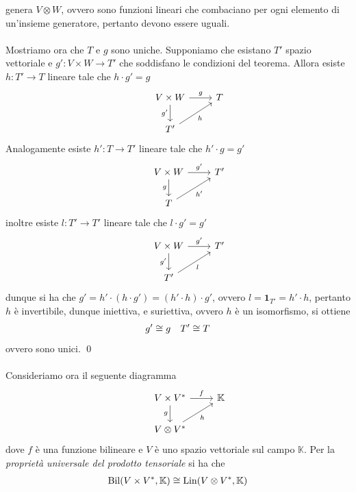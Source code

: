 \documentclass{article}
\begin{document}
genera $V \otimes W$, ovvero sono funzioni lineari che combaciano per ogni elemento di un'insieme generatore, pertanto devono essere uguali. \\ \\
Mostriamo ora che $T$ e $g$ sono uniche. Supponiamo che esistano $T'$ spazio vettoriale e $g' : V \times W \longrightarrow T'$ che soddisfano le condizioni del teorema. Allora esiste $h : T' \longrightarrow T$ lineare tale che $h \cdot g' = g$ \\
\[
\begin{tikzcd}
&V \times W \arrow[r,"g"] \arrow[d,"g'", swap] & T \\
&T' \arrow[ur, "h", swap] 
\end{tikzcd}
\]
Analogamente esiste $h' : T \longrightarrow T'$ lineare tale che $h' \cdot g = g'$ \\
\[
\begin{tikzcd}
&V \times W \arrow[r,"g'"] \arrow[d,"g", swap] & T' \\
&T \arrow[ur, "h'", swap] 
\end{tikzcd}
\]
inoltre esiste $l : T' \longrightarrow T'$ lineare tale che $l \cdot g' = g'$ \\
\[
\begin{tikzcd}
&V \times W \arrow[r,"g'"] \arrow[d,"g'", swap] & T' \\
&T' \arrow[ur, "l", swap] 
\end{tikzcd}
\]
dunque si ha che $g' = h' \cdot (h \cdot g') = (h' \cdot h) \cdot g'$, ovvero $l = \mathbf{1}_{T'} = h' \cdot h$, pertanto $h$ è invertibile, dunque iniettiva, e suriettiva, ovvero $h$ è un isomorfismo, si ottiene
\begin{gather}
    g' \cong g \quad T' \cong T \notag
\end{gather}
ovvero sono unici. \qed \\ \\
Consideriamo ora il seguente diagramma \\
\[
\begin{tikzcd}
&V \times V^* \arrow[r,"f"] \arrow[d,"g", swap] & \mathbb{K} \\
&V \otimes V^* \arrow[ur, "h", swap] 
\end{tikzcd}
\]
dove $f$ è una funzione bilineare e $V$ è uno spazio vettoriale sul campo $\mathbb{K}$. Per la \textit{proprietà universale del prodotto tensoriale} si ha che
\begin{gather}
    \mathrm{Bil}(V \times V^*, \mathbb{K}) \cong \mathrm{Lin}(V \otimes V^*, \mathbb{K}) \notag
\end{gather}
\end{document}

